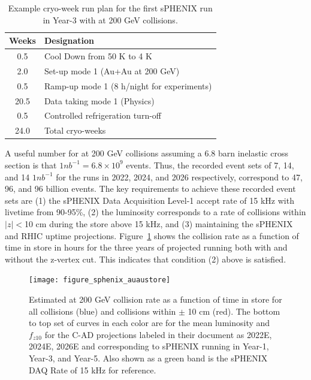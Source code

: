\begin{table}
\centering
\begin{tabular}{ | c | l | }
\hline
Weeks & Designation \\ \hline
0.5  & Cool Down from 50 K to 4 K \\ \hline
2.0  & Set-up mode 1 (Au+Au at 200 GeV) \\ \hline
0.5  & Ramp-up mode 1 (8 h/night for experiments) \\ \hline
20.5 & Data taking mode 1 (Physics) \\ \hline
0.5  & Controlled refrigeration turn-off \\ \hline \hline \hline
24.0 & Total cryo-weeks \\
\hline
\end{tabular}
\caption{Example cryo-week run plan for the first sPHENIX run in Year-3 with \auau at 200 GeV collisions.\label{tab:cryoplan2022}}
\end{table}

A useful number for \auau at 200 GeV collisions assuming a 6.8 barn inelastic cross section is that $1 nb^{-1} = 6.8 \times 10^{9}$ events.    Thus, the recorded event sets of 7, 14, and 14 $1 nb^{-1}$ for the runs in 2022, 2024, and 2026 respectively, correspond to 47, 96, and 96 billion events.   The 
key requirements to achieve these recorded event sets are (1) the sPHENIX Data Acquisition Level-1 accept rate of 15 kHz with livetime from 90-95\%, (2) the luminosity corresponds to a rate of collisions within $|z|<$10 cm during the store above 15 kHz, and (3) maintaining the sPHENIX and RHIC uptime projections.  Figure~\ref{fig:auaulumcurves} shows the \auau collision rate as a function of time in store in hours for the three years of projected running both with and without the z-vertex cut.   This indicates that condition (2) above is satisfied.

\begin{figure}
\centering
\texttt{[image: figure\_sphenix\_auaustore]} %
\caption{Estimated \auau at 200 GeV collision rate as a function of time in store for all collisions (blue) and collisions within $\pm$ 10 cm (red).  The bottom to top set of curves in each color are for the mean luminosity and $f_{z10}$ for the C-AD projections labeled in their document as 2022E, 2024E, 2026E and corresponding to sPHENIX running in Year-1, Year-3, and Year-5.   Also shown as a green band is the sPHENIX DAQ Rate of 15 kHz for reference.
\label{fig:auaulumcurves}}
\end{figure}

